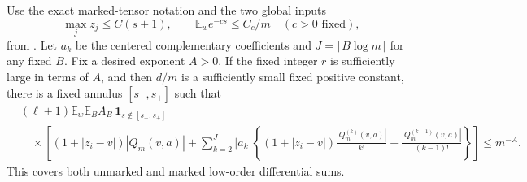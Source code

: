 \documentclass[11pt]{article}
\newcommand{\E}{\mathbb E}
\begin{document}
\begin{theorem}\label{offannulus}
Use the exact marked-tensor notation and the two global inputs
\[
 \max_jz_j\le C(s+1),\qquad
 \E_w e^{-cs}\le C_c/m\quad(c>0\text{ fixed}),
\]
from .
Let $a_k$ be the centered complementary coefficients and
$J=\lceil B\log m\rceil$ for any fixed $B$.
Fix a desired exponent $A>0$. If the fixed integer $r$ is sufficiently
large in terms of $A$, and then $d/m$ is a sufficiently small fixed
positive constant, there is a fixed annulus $[s_-,s_+]$ such that
\begin{align*}
 &(\ell+1)\E_w\E_B A_B\,\boldsymbol1_{s\notin[s_-,s_+]}\\
 &\quad\times\left[(1+|z_i-v|)|Q_m(v,a)|+
 \sum_{k=2}^{J}|a_k|\left\{
 (1+|z_i-v|)\frac{|Q_m^{(k)}(v,a)|}{k!}
       +\frac{|Q_m^{(k-1)}(v,a)|}{(k-1)!}\right\}\right]
 \le m^{-A}.
\end{align*}
This covers both unmarked and marked low-order differential sums.
\end{theorem}
\end{document}
